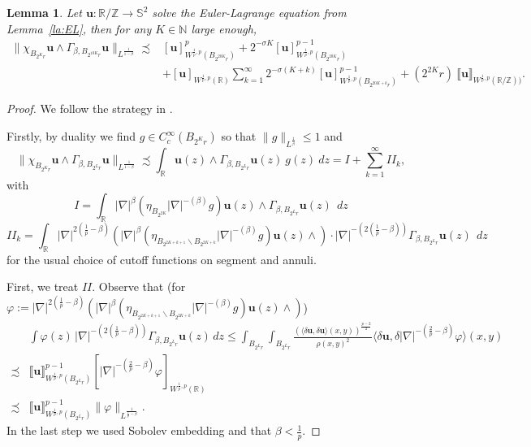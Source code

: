 \documentclass[a4paper,10pt,intlimits,ngerman]{amsart}
\newcommand{\iv}{B} %
\newtheorem{lemma}[theorem]{Lemma}
\numberwithin{equation}{section}
\newcommand{\R}{\mathbb{R}}
\newcommand{\Z}{\mathbb{Z}}
\newcommand{\N}{\mathbb{N}}
\renewcommand{\S}{\mathbb{S}}
\newcommand{\solu}{{\boldsymbol{u}}}
\newcommand{\aleq}{\precsim}
\newcommand{\laps}[1]{|\nabla|^{#1}}
\newcommand{\lapms}[1]{|\nabla|^{-\brac{#1}}}
\newcommand{\brac}[1]{\left ( #1 \right )}
\newcommand{\dmv}[2]{\langle \delta #1, \delta #2\rangle}
\begin{document}
\begin{lemma}\label{la:uwedgeGamma}
Let $\solu: \R/\Z \to \S^2$ solve the Euler-Lagrange equation from Lemma~\ref{la:EL}, then for any $K \in \N$ large enough,
\[
\begin{split}
  \|\chi_{\iv_{2^K r}} \solu \wedge \Gamma_{\beta,\iv_{2^{10K} r}} \solu\|_{L^{\frac{1}{1-\beta}}} \aleq& [\solu]_{W^{\frac{1}{p},p}(\iv_{2^{20K} r})}^p + 2^{-\sigma K} [\solu]_{W^{\frac{1}{p},p}(\iv_{2^{20K} r})}^{p-1}\\
  &+ [\solu]_{W^{\frac{1}{p},p}(\R)} \sum_{k=1}^\infty 2^{-\sigma(K+k)} [\solu]_{W^{\frac{1}{p},p}(\iv_{2^{20K+k}r})}^{p-1} + (2^{2K} r)\ \llbracket \solu \rrbracket_{W^{\frac{1}{p},p}(\R/\Z))}.
\end{split}
  \]
\end{lemma}
\begin{proof}
We follow the strategy in \cite[Lemma 3.5]{SchikorraCPDE14}.

Firstly, by duality we find $g \in C_c^\infty(\iv_{2^K r})$ so that $\|g\|_{L^{\frac{1}{\beta}}} \leq 1$ and
\[
 \|\chi_{\iv_{2^K r}} \solu\wedge\Gamma_{\beta,\iv_{2^L r}}\solu\|_{L^{\frac{1}{1-\beta}}} \aleq \int_{\R} \solu(z) \wedge\Gamma_{\beta,\iv_{2^L r}}\solu(z)\ g(z)\ dz = I + \sum_{k=1}^\infty II_k,
\]
with
\[
 I = \int_{\R} \laps{\beta} (\eta_{\iv_{2^{2K}}} \lapms{\beta} g) \solu(z) \wedge \Gamma_{\beta,\iv_{2^L r}}\solu(z)\ \ dz
\]
\[
 II_k = \int_{\R} \laps{2(\frac{1}{p}-\beta)} \brac{\laps{\beta} \brac{\eta_{\iv_{2^{2K+k+1}}\backslash \iv_{2^{2K+k}}} \lapms{\beta} g} \solu(z)\wedge} \cdot \lapms{2(\frac{1}{p}-\beta)}\Gamma_{\beta,\iv_{2^L r}}\solu(z)\ \ dz
\]
for the usual choice of cutoff functions on segment and annuli.

First, we treat $II$. Observe that (for $\varphi := \laps{2(\frac{1}{p}-\beta)} \brac{\laps{\beta} \brac{\eta_{\iv_{2^{2K+k+1}}\backslash \iv_{2^{2K+k}}} \lapms{\beta} g} \solu(z)\wedge}$)
\[
\begin{split}
 &\int \varphi(z)\, \lapms{2(\frac{1}{p}-\beta)}\Gamma_{\beta,\iv_{2^L r}}\solu(z)\, dz \leq \int_{\iv_{2^L r}}\int_{\iv_{2^L r}} \frac{(\dmv{\solu}{\solu}(x,y))^{\frac{p-2}{2}}}{\rho(x,y)^2} \dmv{\solu}{\lapms{\frac{2}{p}-\beta} \varphi}(x,y)\\
 \aleq & \llbracket \solu \rrbracket_{W^{\frac{1}{p},p}(\iv_{2^L r})}^{p-1} [\lapms{\frac{2}{p}-\beta} \varphi ]_{W^{\frac{1}{p},p}(\R)}\\
 \aleq & \llbracket \solu \rrbracket_{W^{\frac{1}{p},p}(\iv_{2^L r})}^{p-1} \|\varphi \|_{L^{\frac{1}{\frac{2}{p}-\beta}}}.
\end{split}
 \]
In the last step we used Sobolev embedding and that $\beta < \frac{1}{p}$.


\end{proof}
\end{document}
